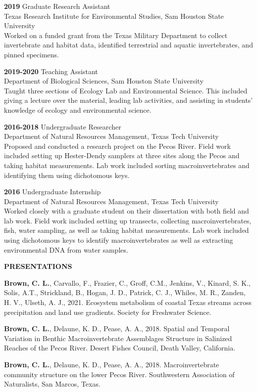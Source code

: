 \begin{singlespace}
\medskip\textbf{2019} Graduate Research Assistant\\Texas Research Institute for Environmental Studies, Sam Houston State University\\Worked on a funded grant from the Texas Military Department to collect invertebrate and habitat data, identified terrestrial and aquatic invertebrates, and pinned specimens.

\medskip\textbf{2019-2020} Teaching Assistant\\Department of Biological Sciences, Sam Houston State University\\Taught three sections of Ecology Lab and Environmental Science. This included giving a lecture over the material, leading lab activities, and assisting in students' knowledge of ecology and environmental science.

\medskip\textbf{2016-2018} Undergraduate Researcher\\Department of Natural Resources Management, Texas Tech University\\Proposed and conducted a research project on the Pecos River. Field work included setting up Hester-Dendy samplers at three sites along the Pecos and taking habitat measurements. Lab work included sorting macroinvertebrates and identifying them using dichotomous keys.

\medskip\textbf{2016} Undergraduate Internship\\Department of Natural Resources Management, Texas Tech University\\Worked closely with a graduate student on their dissertation with both field and lab work. Field work included setting up transects, collecting macroinvertebrates, fish, water sampling, as well as taking habitat measurements. Lab work included using dichotomous keys to identify macroinvertebrates as well as extracting environmental DNA from water samples.

\bigskip\textbf{PRESENTATIONS}

\smallskip\textbf{Brown, C. L.}, Carvallo, F., Frazier, C., Groff, C.M., Jenkins, V., Kinard, S. K., Solis, A.T., Strickland, B., Hogan, J. D., Patrick, C. J., Whiles, M. R., Zanden, H. V., Ulseth, A. J., 2021. Ecosystem metabolism of coastal Texas streams across precipitation and land use gradients. Society for Freshwater Science.

\medskip\textbf{Brown, C. L.}, Delaune, K. D., Pease, A. A., 2018. Spatial and Temporal Variation in Benthic Macroinvertebrate Assemblages Structure in Salinized Reaches of the Pecos River. Desert Fishes Council, Death Valley, California.

\medskip\textbf{Brown, C. L.}, Delaune, K. D., Pease, A. A., 2018. Macroinvertebrate community structure on the lower Pecos River. Southwestern Association of Naturalists, San Marcos, Texas.
\end{singlespace}
\endinput

